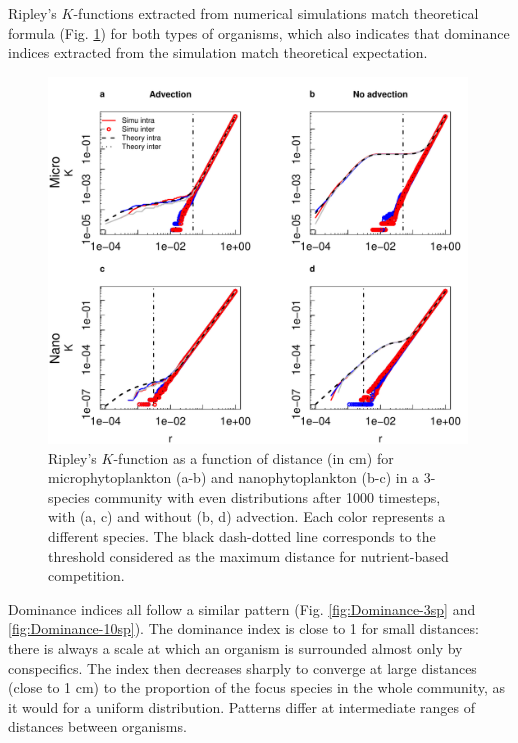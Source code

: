 \documentclass[english]{article}
\begin{document}
Ripley's $K$-functions extracted from numerical simulations match
theoretical formula (Fig. \ref{fig:Ripley's-K-function}) for both
types of organisms, which also indicates that dominance indices extracted
from the simulation match theoretical expectation.

\begin{figure}[H]
\begin{centering}
\includegraphics[width=0.99\textwidth]{../code/figure/K_micronano}
\par\end{centering}
\caption{Ripley's $K$-function as a function of distance (in cm) for microphytoplankton
(a-b) and nanophytoplankton (b-c) in a 3-species community with even
distributions after 1000 timesteps, with (a, c) and without (b, d)
advection. Each color represents a different species. The black dash-dotted
line corresponds to the threshold considered as the maximum distance
for nutrient-based competition.\label{fig:Ripley's-K-function} }
\end{figure}

Dominance indices all follow a similar pattern (Fig. \ref{fig:Dominance-3sp}
and \ref{fig:Dominance-10sp}). The dominance index is close to 1
for small distances: there is always a scale at which an organism
is surrounded almost only by conspecifics. The index then decreases
sharply to converge at large distances (close to 1 cm) to the proportion
of the focus species in the whole community, as it would for a uniform
distribution. Patterns differ at intermediate ranges of distances
between organisms.
\end{document}
